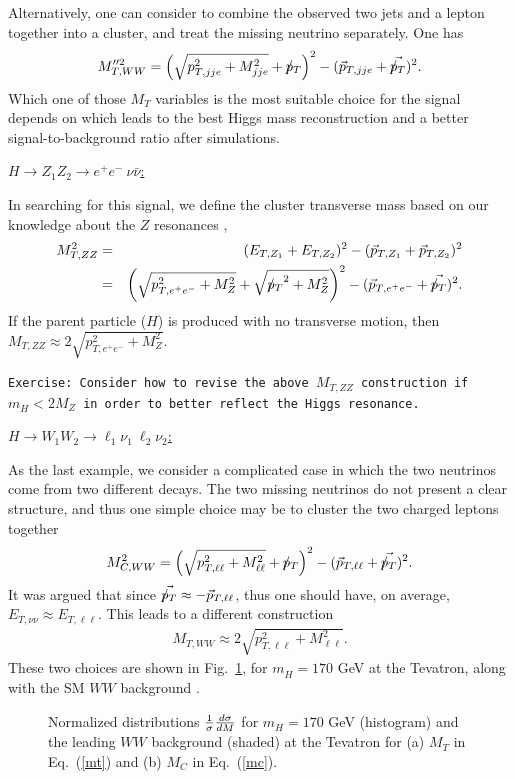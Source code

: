 \documentclass[12pt,prd,aps,floats,preprintnumbers,preprint,superscriptaddress,floatfix,nofootinbib]{revtex4}
\newcommand{ \slashchar }[1]{\setbox0=\hbox{$#1$}   %
   \dimen0=\wd0                                     %
   \setbox1=\hbox{/} \dimen1=\wd1                   %
   \ifdim\dimen0>\dimen1                            %
      \rlap{\hbox to \dimen0{\hfil/\hfil}}          %
      #1                                            %
   \else                                            %
      \rlap{\hbox to \dimen1{\hfil$#1$\hfil}}       %
      /                                             %
   \fi}                                             %
\def\ptmiss{\slashchar{p}_{T}}
\def\epem{e^+e^-}
\def\bea{\begin{eqnarray}}
\def\eea{\end{eqnarray}}
\begin{document}
Alternatively, one can consider to combine the observed two jets and a lepton 
together into a cluster, and treat the missing neutrino separately. One has 
\bea
 M_{T,WW}^{\prime\prime 2}
= \left(\sqrt{p_{T,jje}^2 + M_{jje}^2} + \ptmiss   \right)^2 
- (\vec p_{T,jje} + \vec{\ptmiss } )^2.
\nonumber
\eea
Which one of those $M_T$ variables is the most suitable choice for the signal
depends on which leads to the best Higgs mass reconstruction and a better
signal-to-background ratio after simulations.

\vskip 0.2cm
\noindent
\underline{$H\to Z_1 Z_2 \to \epem\ \nu\bar\nu$:}

In searching for this signal,  we define the cluster transverse mass based
on our knowledge about the $Z$ resonances  \cite{MTH},
\bea
\nonumber
 M_{T,ZZ}^2 &=&  (E_{T,Z_1} + E_{T,Z_2} )^2 - (\vec p_{T,Z_1} + \vec p_{T,Z_2} )^2 \\
&=& \left(\sqrt{p_{T,\epem}^2 + M_Z^2} + \sqrt{ {\ptmiss}^2 + M_Z^2}  \right)^2 
- (\vec p_{T,\epem} + \vec{\ptmiss } )^2.
\nonumber
\eea
If the parent particle ($H$) is produced with no transverse motion, then
$M_{T,ZZ} \approx 2 \sqrt{p_{T,\epem}^2 + M_Z^2}. $

{
\vskip 0.2cm
\noindent
\tt Exercise: Consider how to revise the above $M_{T,ZZ}$ construction
if $m_H^{} < 2M_Z$ in order to better reflect the Higgs resonance.
\vskip 0.2cm
}

\vskip 0.2cm
\noindent
\underline{$H\to W_1 W_2 \to \ell_1\nu_1\ \ell_2 \nu_2$:}

As the last example, we consider a complicated case in which the two
neutrinos come from two different decays. The two missing neutrinos
do not present a clear structure, and thus one simple choice may be
to cluster the two charged leptons together  \cite{CMT}
\bea
 M_{C,WW}^{2}
= \left(\sqrt{p_{T,\ell\ell}^2 + M_{\ell\ell}^2} + \ptmiss   \right)^2 
- (\vec p_{T,\ell\ell} + \vec{\ptmiss } )^2.
\label{mc}
\eea
It was argued that since $\vec{\ptmiss} \approx - \vec p_{T,\ell\ell}$,
thus one should have, on average, $E_{T,\nu\nu} \approx E_{T, \ell\ell}$. 
This leads to a different construction \cite{Herbi}
\bea
 M_{T,WW}^{} \approx 2 \sqrt{p_{T,\ell\ell}^2 + M_{\ell\ell}^2}.
\label{mt}
\eea
These two choices are shown in Fig.~\ref{MTtc}, for $m_H^{}=170$ GeV
at the Tevatron, along with the SM $WW$ background \cite{HanZhang}.

\begin{center}
\begin{figure}[tb]
\vskip -1cm
\caption{ Normalized distributions 
${1\over \sigma} {d\sigma\over d M}$ for  $m_H^{}=170$ GeV (histogram)
and the leading $WW$ background (shaded) at the Tevatron for (a) $M_T$ 
in Eq.~(\ref{mt}) and (b) $M_C$ in Eq.~(\ref{mc}).}
\label{MTtc}
\end{figure}
\end{center}
 
\end{document}
